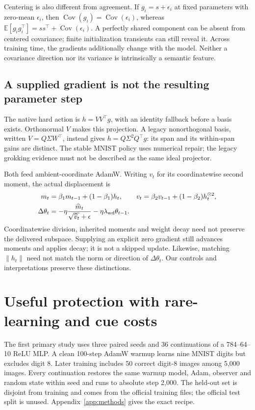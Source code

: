 \documentclass[10pt]{article}
\newcommand{\E}{\mathbb{E}}
\newcommand{\Cov}{\operatorname{Cov}}
\newcommand{\norm}[1]{\left\lVert#1\right\rVert}
\begin{document}
Centering is also different from agreement. If $g_i=s+\epsilon_i$ at fixed parameters with zero-mean $\epsilon_i$, then $\Cov(g_i)=\Cov(\epsilon_i)$, whereas $\E[g_ig_i^\top]=ss^\top+\Cov(\epsilon_i)$. A perfectly shared component can be absent from centered covariance; finite initialization transients can still reveal it. Across training time, the gradients additionally change with the model. Neither a covariance direction nor its variance is intrinsically a semantic feature.

\subsection{A supplied gradient is not the resulting parameter step}
The native hard action is $h=VV^\top g$, with an identity fallback before a basis exists. Orthonormal $V$ makes this projection. A legacy nonorthogonal basis, written $V=Q\Sigma W^\top$, instead gives $h=Q\Sigma^2Q^\top g$: its span and its within-span gains are distinct. The stable MNIST policy uses numerical repair; the legacy grokking evidence must not be described as the same ideal projector.

Both feed ambient-coordinate AdamW. Writing $v_t$ for its coordinatewise second moment, the actual displacement is
\begin{align}
m_t&=\beta_1m_{t-1}+(1-\beta_1)h_t,\qquad
v_t=\beta_2v_{t-1}+(1-\beta_2)h_t^{\odot2},\\
\Delta\theta_t&=-\eta\frac{\widehat m_t}{\sqrt{\widehat v_t}+\epsilon}-\eta\lambda_{\rm wd}\theta_{t-1}.
\end{align}
Coordinatewise division, inherited moments and weight decay need not preserve the delivered subspace. Supplying an explicit zero gradient still advances moments and applies decay; it is not a skipped update. Likewise, matching $\norm{h_t}$ need not match the norm or direction of $\Delta\theta_t$. Our controls and interpretations preserve these distinctions.

\section{Useful protection with rare-learning and cue costs}
\label{sec:select}
The first primary study uses three paired seeds and 36 continuations of a 784--64--10 ReLU MLP. A clean 100-step AdamW warmup learns nine MNIST digits but excludes digit 8. Later training includes 50 correct digit-8 images among 5,000 images. Every continuation restores the same warmup model, Adam, observer and random state within seed and runs to absolute step 2,000. The held-out set is disjoint from training and comes from the official training files; the official test split is unused. Appendix~\ref{app:methods} gives the exact recipe.
\end{document}
